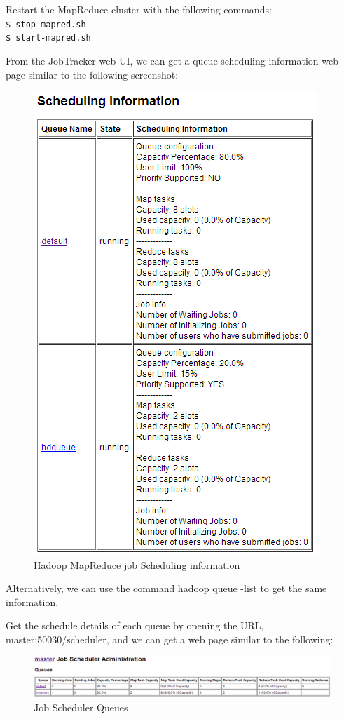 Restart the MapReduce cluster with the following commands: \\
\verb|$ stop-mapred.sh| \\
\verb|$ start-mapred.sh| 

From the JobTracker web UI, we can get a queue scheduling information web page similar to the following screenshot: \\
\begin{figure}[h]
  \centering
  \includegraphics[width=.65\textwidth]{figs/5163os_04_17.png}
  \caption{Hadoop MapReduce job Scheduling information}\label{fig:mapred.scheduling}
\end{figure} 


Alternatively, we can use the command hadoop queue -list to get the same information. 

Get the schedule details of each queue by opening the URL, master:50030/scheduler, and we can get a web page similar to the following: 
\begin{figure}[h]
  \centering
  \includegraphics[width=\textwidth]{figs/5163os_04_18.png}
  \caption{Job Scheduler Queues}\label{fig:job.queues}
\end{figure} 

